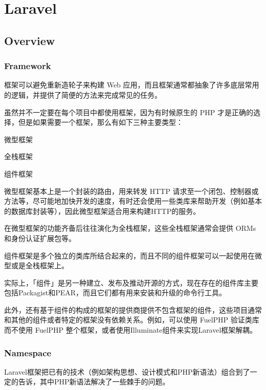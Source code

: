 \part{Laravel}



\chapter{Overview}






\section{Framework}


框架可以避免重新造轮子来构建 Web 应用，而且框架通常都抽象了许多底层常用的逻辑，并提供了简便的方法来完成常见的任务。

虽然并不一定要在每个项目中都使用框架，因为有时候原生的 PHP 才是正确的选择，但是如果需要一个框架，那么有如下三种主要类型：

\begin{compactitem}
\item 微型框架
\item 全栈框架
\item 组件框架
\end{compactitem}

微型框架基本上是一个封装的路由，用来转发 HTTP 请求至一个闭包、控制器或方法等，尽可能地加快开发的速度，有时还会使用一些类库来帮助开发（例如基本的数据库封装等），因此微型框架适合用来构建HTTP的服务。

在微型框架的功能齐备后往往演化为全栈框架，这些全栈框架通常会提供 ORMs和身份认证扩展包等。

组件框架是多个独立的类库所结合起来的，而且不同的组件框架可以一起使用在微型或是全栈框架上。

实际上，「组件」是另一种建立、发布及推动开源的方式，现在存在的组件库主要包括Packagist和PEAR，而且它们都有用来安装和升级的命令行工具。

此外，还有基于组件的构成的框架的提供商提供不包含框架的组件，这些项目通常和其他的组件或者特定的框架没有依赖关系。例如，可以使用 FuelPHP 验证类库而不使用 FuelPHP 整个框架，或者使用Illuminate组件来实现Laravel框架解耦。


\section{Namespace}

Laravel框架把已有的技术（例如架构思想、设计模式和PHP新语法）组合到了一定的告诉，其中PHP新语法解决了一些棘手的问题。

